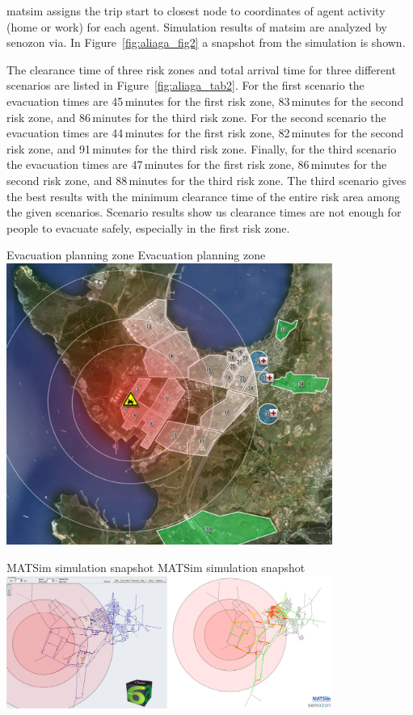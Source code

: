 \gls{matsim} assigns the trip start to closest node to coordinates of agent activity (\ie home or work) for each agent. Simulation results of \gls{matsim} are analyzed by \gls{senozon} \gls{via}. In Figure~\ref{fig:aliaga_fig2} a snapshot from the simulation is shown.

The clearance time of three risk zones and total arrival time for three different scenarios are listed in Figure~\ref{fig:aliaga_tab2}. For the first scenario the evacuation times are 45\,minutes for the first risk zone, 83\,minutes for the second risk zone, and 86\,minutes for the third risk zone. For the second scenario the evacuation times are 44\,minutes for the first risk zone, 82\,minutes for the second risk zone, and 91\,minutes for the third risk zone. Finally, for the third scenario the evacuation times are 47\,minutes for the first risk zone, 86\,minutes for the second risk zone, and 88\,minutes for the third risk zone. The third scenario gives the best results with the minimum clearance time of the entire risk area among the given scenarios. Scenario results show us clearance times are not enough for people to evacuate safely, especially in the first risk zone.


\createfigure%
{Evacuation planning zone}%
{Evacuation planning zone}%
{\label{fig:aliaga_fig1}}%
{\includegraphics[width=0.8\textwidth, angle=0]{scenarios/figures/aliaga_fig1.png}}%
{}

\createfigure%
{MATSim simulation snapshot}%
{MATSim simulation snapshot}%
{\label{fig:aliaga_fig2}}%
{\includegraphics[width=0.8\textwidth, angle=0]{scenarios/figures/aliaga_fig2.png}}%
{}

